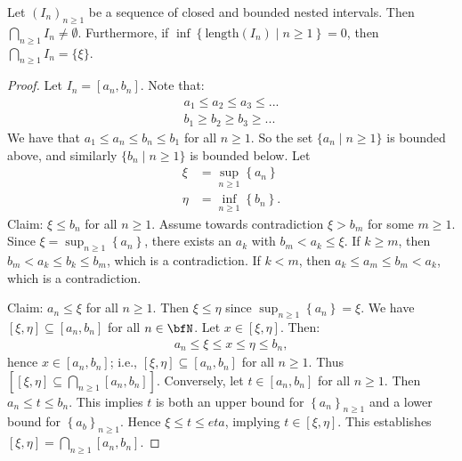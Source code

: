     \begin{theorem}\label{thm:nested-intervals}
        Let $(I_n)_{n \geq 1}$ be a sequence of closed and bounded nested intervals. Then $\bigcap_{n \geq 1}I_n \neq \emptyset$. Furthermore, if $\inf\left\{\text{length}(I_n)\mid n \geq 1\right\} = 0$, then $\bigcap_{n \geq 1}I_n = \{\xi\}$.
    \end{theorem}
        \begin{proof}
            Let $I_n = [a_n,b_n]$. Note that:
                \begin{equation*}
                \begin{split}
                    a_1 \leq a_2 \leq a_3 \leq ... \\
                    b_1 \geq b_2 \geq b_3 \geq ...
                \end{split}
                \end{equation*}
            We have that $a_1 \leq a_n \leq b_n \leq b_1$ for all $n \geq 1$. So the set $\{a_n \mid n \geq 1\}$ is bounded above, and similarly $\{b_n \mid n \geq 1 \}$ is bounded below. Let
                \begin{equation*}
                \begin{split}
                    \xi &= \sup_{n \geq 1}\left\{a_n\right\} \\
                    \eta &= \inf_{n \geq 1}\left\{b_n\right\}.
                \end{split}
                \end{equation*}
            Claim: $\xi \leq b_n$ for all $n \geq 1$. Assume towards contradiction $\xi > b_m$ for some $m \geq 1$. Since $\xi = \sup_{n \geq 1} \left\{a_n\right\}$, there exists an $a_k$ with $b_m < a_k \leq \xi$. If $k \geq m$, then $b_m < a_k \leq b_k \leq b_m$, which is a contradiction. If $k < m$, then $a_k \leq a_m \leq b_m < a_k$, which is a contradiction.

            Claim: $a_n \leq \xi$ for all $n \geq 1$. Then $\xi \leq \eta$ since $\sup_{n \geq 1} \left\{a_n\right\} = \xi$. We have $[\xi, \eta] \subseteq [a_n,b_n]$ for all $n \in \bfN$. Let $x \in [\xi, \eta]$. Then:
                \begin{equation*}
                \begin{split}
                    a_n \leq \xi \leq x \leq \eta \leq b_n,
                \end{split}
                \end{equation*}
            hence $x \in [a_n,b_n]$; i.e., $[\xi ,\eta] \subseteq [a_n,b_n]$ for all $n \geq 1$. Thus $[[\xi ,\eta] \subseteq \bigcap_{n \geq 1}[a_n,b_n]]$. Conversely, let $t \in [a_n,b_n]$ for all $n \geq 1$. Then $a_n \leq t \leq b_n$. This implies $t$ is both an upper bound for $\left\{a_n\right\}_{n\geq 1}$ and a lower bound for $\left\{a_b\right\}_{n\geq 1}$. Hence $\xi \leq t \leq eta$, implying $t \in [\xi, \eta]$. This establishes $[\xi , \eta] = \bigcap_{n \geq 1}[a_n,b_n]$.


\end{proof}
